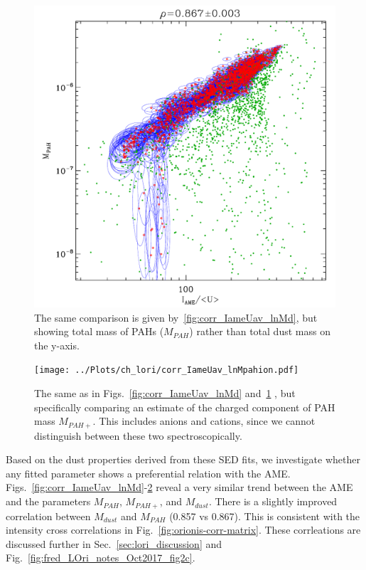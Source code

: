               \begin{figure}
                \includegraphics[width=\textwidth]{../Plots/ch_lori/corr_IameUav_lnMpah.pdf}
                \centering
                \caption{The same comparison is given by~\ref{fig:corr_IameUav_lnMd}, but showing total mass of PAHs ($M_{PAH}$) rather than total dust mass on the y-axis. }
                \label{fig:corr_IameUav_lnMpah}
              \end{figure}
              \begin{figure}
                \texttt{[image: ../Plots/ch\_lori/corr\_IameUav\_lnMpahion.pdf]}
                \centering
                \caption{ The same as in Figs.~\ref{fig:corr_IameUav_lnMd} and~\ref{fig:corr_IameUav_lnMpah} , but specifically comparing an estimate of the charged component of PAH mass $M_{PAH+}$. This includes anions and cations, since we cannot distinguish between these two spectroscopically.}
                \label{fig:corr_IameUav_lnMpahion}
              \end{figure}
    Based on the dust properties derived from these SED fits, we investigate whether any fitted parameter shows a preferential relation with the AME. Figs.~\ref{fig:corr_IameUav_lnMd}-\ref{fig:corr_IameUav_lnMpahion} reveal a very similar trend between the AME and the parameters $M_{PAH}$, $M_{PAH+}$, and $M_{dust}$. There is a slightly improved correlation between $M_{dust}$ and $M_{PAH}$ (0.857 vs 0.867). This is consistent with the intensity cross correlations in Fig.~\ref{fig:orionis-corr-matrix}. These corrleations are discussed further in Sec.~\ref{sec:lori_discussion} and Fig.~\ref{fig:fred_LOri_notes_Oct2017_fig2c}.

